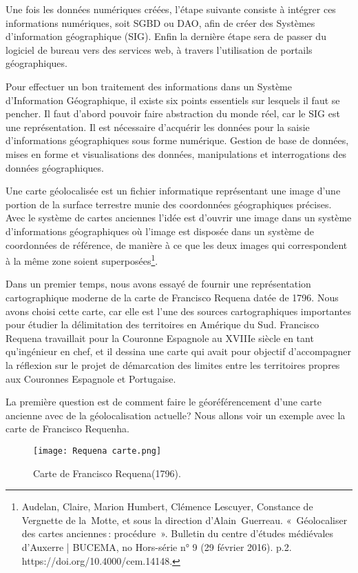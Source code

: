 \documentclass[a4paper,12pt,twoside]{book}
\begin{document}
Une fois les données numériques créées, l’étape suivante consiste à intégrer ces informations numériques, soit \Gls{SGBD} ou \Gls{DAO}, afin de créer des Systèmes d’information géographique (SIG). Enfin la dernière étape sera de passer du logiciel de bureau vers des services web, à travers l’utilisation de portails géographiques. 

Pour effectuer un bon traitement des informations dans un Système d’Information Géographique, il existe six points essentiels sur lesquels il faut se pencher. Il faut d’abord pouvoir faire abstraction du monde réel, car le SIG est une représentation. Il est nécessaire d’acquérir les données pour la saisie d’informations géographiques sous forme numérique. Gestion de base de données, mises en forme et visualisations des données, manipulations et interrogations des données géographiques.

Une carte géolocalisée est un fichier informatique représentant une image d’une portion de la surface terrestre munie des coordonnées géographiques précises. Avec le système de cartes anciennes l’idée est d’ouvrir une image dans un système d’informations géographiques où l’image est disposée dans un système de coordonnées de référence, de manière à ce que les deux images qui correspondent à la même zone soient superposées\footnote{Audelan, Claire, Marion Humbert, Clémence Lescuyer, Constance de Vergnette de la Motte, et sous la direction d’Alain Guerreau. « Géolocaliser des cartes anciennes : procédure ». Bulletin du centre d’études médiévales d’Auxerre | BUCEMA, no Hors-série n° 9 (29 février 2016). p.2.  https://doi.org/10.4000/cem.14148.}. 

Dans un premier temps, nous avons essayé de fournir une représentation cartographique moderne de la carte de Francisco Requena datée de 1796. Nous avons choisi cette carte, car elle est l’une des sources cartographiques importantes pour étudier la délimitation des territoires en Amérique du Sud. Francisco Requena travaillait pour la Couronne Espagnole au XVIIIe siècle en tant qu’ingénieur en chef, et il dessina une carte qui avait pour objectif d’accompagner la réflexion sur le projet de démarcation des limites entre les territoires propres aux Couronnes Espagnole et Portugaise. 

La première question est de comment faire le géoréférencement d’une carte ancienne avec de la géolocalisation actuelle? Nous allons voir un exemple avec la carte de Francisco Requenha.\\


\begin{figure}[!h]
    \centering
    \texttt{[image: Requena carte.png]}
    \caption{Carte de Francisco Requena(1796).}
    \label{onzeFig}
\end{figure}
\end{document}
